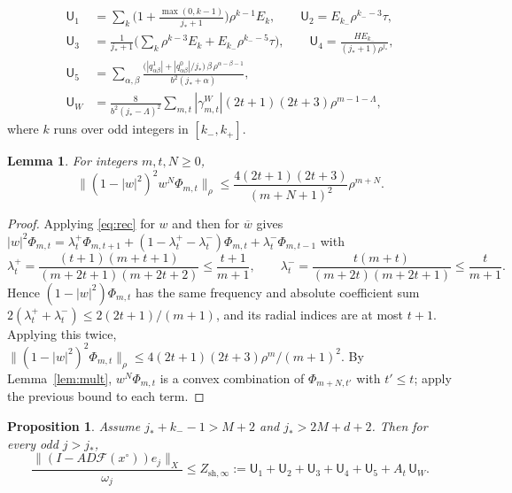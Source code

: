 \documentclass[11pt]{amsart}
\newtheorem{proposition}[theorem]{Proposition}
\newtheorem{lemma}[theorem]{Lemma}
\theoremstyle{definition}
\theoremstyle{remark}
\numberwithin{equation}{section}
\newcommand{\Fc}{\mathcal{F}}
\newcommand{\bw}{\overline{w}}
\newcommand{\jst}{j_*}
\newcommand{\sU}{\mathsf{U}}
\newcommand{\nrm}[1]{\lVert #1\rVert}
\begin{document}
\begin{align*}
\sU_1&=\sum_k\Big(1+\frac{\max(0,k-1)}{\jst+1}\Big)\rho^{k-1}E_k, \qquad
\sU_2=E_{k_-}\rho^{k_--3}\tau,\\
\sU_3&=\frac{1}{\jst+1}\Big(\sum_k\rho^{k-3}E_k+E_{k_-}\rho^{k_--5}\tau\Big), \qquad
\sU_4=\frac{HE_{k_-}}{(\jst+1)\rho^{\jst}},\\
\sU_5&=\sum_{\alpha,\beta}\frac{\big(|q^1_{\alpha\beta}|+|q^0_{\alpha\beta}|/\jst\big)\,\beta\,\rho^{\alpha-\beta-1}}{b^2(\jst+\alpha)},\\
\sU_W&=\frac{8}{b^2(\jst-\Lambda)^2}\sum_{m,t}|\gamma^W_{m,t}|(2t+1)(2t+3)\rho^{m-1-\Lambda},
\end{align*}
where $k$ runs over odd integers in $[k_-,k_+]$.

\begin{lemma}\label{lem:doublezero}
For integers $m,t,N\geq0$,
\[
\nrm{(1-|w|^2)^2w^N\Phi_{m,t}}_\rho\leq\frac{4(2t+1)(2t+3)}{(m+N+1)^2}\rho^{m+N}.
\]
\end{lemma}

\begin{proof}
Applying \eqref{eq:rec} for $w$ and then for $\bw$ gives $|w|^2\Phi_{m,t}=\lambda^+_t\Phi_{m,t+1}+(1-\lambda^+_t-\lambda^-_t)\Phi_{m,t}+\lambda^-_t\Phi_{m,t-1}$ with
\[
\lambda^+_t=\frac{(t+1)(m+t+1)}{(m+2t+1)(m+2t+2)}\leq\frac{t+1}{m+1},\qquad\lambda^-_t=\frac{t(m+t)}{(m+2t)(m+2t+1)}\leq\frac{t}{m+1}.
\]
Hence $(1-|w|^2)\Phi_{m,t}$ has the same frequency and absolute coefficient sum $2(\lambda_t^++\lambda_t^-)\leq2(2t+1)/(m+1)$, and its radial indices are at most $t+1$. Applying this twice, $\nrm{(1-|w|^2)^2\Phi_{m,t}}_\rho\leq4(2t+1)(2t+3)\rho^m/(m+1)^2$. By Lemma~\ref{lem:mult}, $w^N\Phi_{m,t}$ is a convex combination of $\Phi_{m+N,t'}$ with $t'\leq t$; apply the previous bound to each term.
\end{proof}

\begin{proposition}\label{prop:farshape}
Assume $\jst+k_--1>M+2$ and $\jst>2M+d+2$. Then for every odd $j>\jst$,
\[
\frac{\nrm{(I-AD\Fc(x^\circ))e_j}_X}{\omega_j}\leq Z_{\mathrm{sh},\infty}:=\sU_1+\sU_2+\sU_3+\sU_4+\sU_5+A_t\,\sU_W .
\]
\end{proposition}
\end{document}
